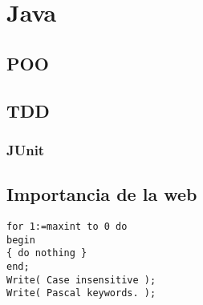 \chapter{Java}
	\section{POO}
	\section{TDD}
		\subsection{JUnit}
	\section{Importancia de la web}



\lstset{language=Java}
\begin{lstlisting}[frame=single]
for 1:=maxint to 0 do
begin
{ do nothing }
end;
Write( Case insensitive );
Write( Pascal keywords. );
\end{lstlisting}